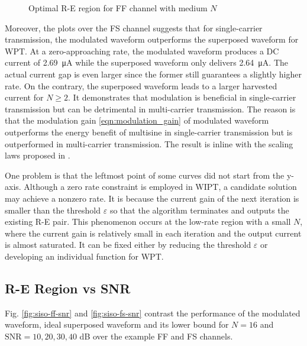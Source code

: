 \begin{figure}[ht]
  \centering
  \caption{Optimal R-E region for FF channel with medium $N$}\label{fig:siso-subband-optimal}
\end{figure}

Moreover, the plots over the FS channel suggests that for single-carrier transmission, the modulated waveform outperforms the superposed waveform for WPT. At a zero-approaching rate, the modulated waveform produces a DC current of \SI{2.69}{\uA} while the superposed waveform only delivers \SI{2.64}{\uA}. The actual current gap is even larger since the former still guarantees a slightly higher rate. On the contrary, the superposed waveform leads to a larger harvested current for $N \geqslant 2$. It demonstrates that modulation is beneficial in single-carrier transmission but can be detrimental in multi-carrier transmission. The reason is that the modulation gain \eqref{eqn:modulation_gain} of modulated waveform outperforms the energy benefit of multisine in single-carrier transmission but is outperformed in multi-carrier transmission. The result is inline with the scaling laws proposed in \cite{Clerckx2018}.

One problem is that the leftmost point of some curves did not start from the y-axis. Although a zero rate constraint is employed in WIPT, a candidate solution may achieve a nonzero rate. It is because the current gain of the next iteration is smaller than the threshold $\varepsilon$ so that the algorithm terminates and outputs the existing R-E pair. This phenomenon occurs at the low-rate region with a small $N$, where the current gain is relatively small in each iteration and the output current is almost saturated. It can be fixed either by reducing the threshold $\varepsilon$ or developing an individual function for WPT.



\subsection{R-E Region vs SNR}\label{sec:re-region-vs-snr}
Fig. \ref{fig:siso-ff-snr} and \ref{fig:siso-fs-snr} contrast the performance of the modulated waveform, ideal superposed waveform and its lower bound for $N = 16$ and ${\text{SNR}} = 10,20,30,40$ dB over the example FF and FS channels.

